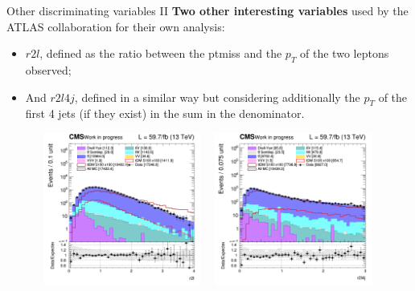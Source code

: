\documentclass[8pt]{beamer}
\begin{document}
\begin{frame}{Other discriminating variables II}
\justifying
\textbf{Two other interesting variables} used by the ATLAS collaboration for their own analysis:
\vspace{-10pt}
\begin{itemize}
\justifying
\item $r2l$, defined as the ratio between the ptmiss and the $p_T$ of the two leptons observed; \item And $r2l4j$, defined in a similar way but considering additionally the $p_T$ of the first 4 jets (if they exist) in the sum in the denominator.
\end{itemize} \vfill

\begin{figure}[htbp]
\centering
\begin{minipage}[b]{.49\textwidth}
\includegraphics[width=5.5cm, height=5cm]{figs/2018/SmearSR-ttDM-scalar100/log_cratio_topCR_ll_r2l.png}
\end{minipage}\hfill
\begin{minipage}[b]{.49\textwidth}
\includegraphics[width=5.5cm, height=5cm]{figs/2018/SmearSR-ttDM-scalar100/log_cratio_topCR_ll_r2l4j.png}
\end{minipage} \hfill
\end{figure} \vfill
\end{frame}
\end{document}
